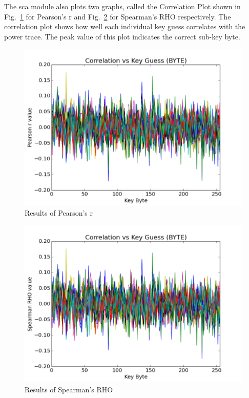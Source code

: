 \documentclass{llncs}
\numberwithin{algorithm}{chapter}
\begin{document}
The sca module also plots two graphs, called the Correlation Plot 
shown in Fig.~\ref{fig:prcorrplt} for Pearson's r and Fig.~\ref{fig:spcorrplt} for 
Spearman's RHO respectively.  
The correlation plot shows how well each individual key guess correlates with the power trace.
The peak value of this plot indicates the correct sub-key byte. 

\begin{figure}[H]
\begin{center}
\includegraphics[scale=0.8]{figures/pearson-r}
\caption{\label{fig:prcorrplt}Results of Pearson's r}
\end{center} 
\vspace{-3ex}
\end{figure}

\begin{figure}[H]
\begin{center}
\includegraphics[scale=0.8]{figures/spearman-rho}
\caption{\label{fig:spcorrplt}{Results of Spearman's RHO}}
\end{center} 
\vspace{-3ex}
\end{figure}


\end{document}
